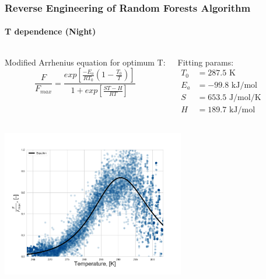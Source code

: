 \documentclass{beamer}
\begin{document}
\begin{frame}
\frametitle{Reverse Engineering of Random Forests Algorithm}
\framesubtitle{T dependence (Night)}

\begin{columns}[t]
\tiny
{}
\centering
Modified Arrhenius equation for optimum T:
\begin{equation}
    \frac{F}{F_{max}} = \frac{exp\left[\frac{-E_a}{RT_0}\left(1 - \frac{T_0}{T} \right)\right]}{1 + exp\left[ \frac{S T - H}{RT} \right]}
\end{equation}

\tiny
\centering
Fitting params:
\begin{align}
T_0 &= 287.5 \text{ K} \\
E_a &= - 99.8 \text{ kJ/mol} \\
S &= 653.5 \text{ J/mol/K} \\
H &= 189.7 \text{ kJ/mol}
\end{align}


\end{columns}
\centering
\includegraphics[width=0.6\textwidth]{T_dependence_all_ENF_With9010_Quartiles_b.png}
\end{frame}
\end{document}
